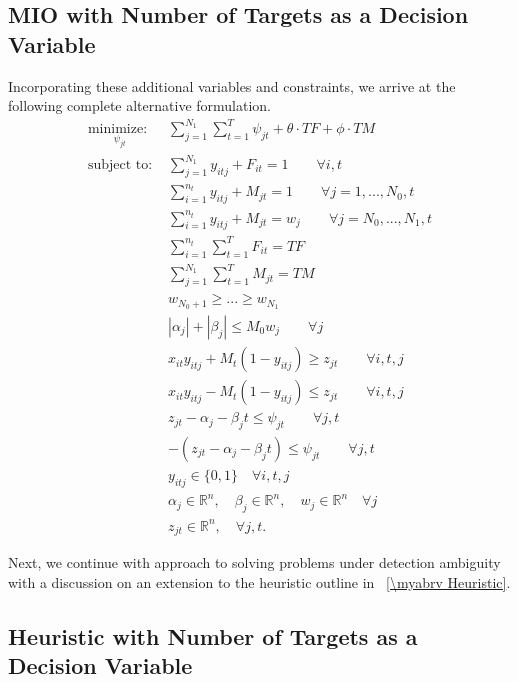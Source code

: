 \subsection{MIO with Number of Targets as a Decision Variable}
Incorporating these additional variables and constraints, we arrive at the following complete alternative formulation.
\begin{align*}
\underset{\psi_{jt}}{\text{minimize: }} & \sum_{j=1}^{N_{1}} \sum_{t=1}^{T} \psi_{jt} + \theta \cdot TF + \phi \cdot TM\\
\text{subject to: }	& \sum_{j=1}^{N_{1}} y_{itj} + F_{it} = 1 \qquad \forall i,t \nonumber\\
				& \sum_{i=1}^{n_{t}} y_{itj} + M_{jt} = 1 \qquad \forall j=1,...,N_{0},t \nonumber \\
				& \sum_{i=1}^{n_{t}} y_{itj} + M_{jt} = w_{j} \qquad \forall j=N_{0},...,N_{1},t \nonumber \\
				& \sum_{i=1}^{n_{t}} \sum_{t=1}^{T} F_{it} = TF \nonumber \\
				& \sum_{j=1}^{N_{1}} \sum_{t=1}^{T} M_{jt} = TM \nonumber \\
				& w_{N_0+1}\geq ...\geq w_{N_1} \nonumber \\
				& |\alpha_{j}|+|\beta_{j}| \leq M_{0}w_{j}\qquad \forall j \nonumber \\
				& x_{it}y_{itj} + M_{t}(1-y_{itj}) \geq z_{jt} \qquad \forall i,t,j \nonumber \\
				& x_{it}y_{itj} - M_{t}(1-y_{itj}) \leq z_{jt} \qquad \forall i,t,j \nonumber \\
				& z_{jt} - \alpha_{j} - \beta_{j}t \leq \psi_{jt} \qquad \forall j,t \nonumber \\
				& -(z_{jt} - \alpha_{j} - \beta_{j}t) \leq \psi_{jt} \qquad \forall j,t \nonumber \\
			 	& y_{itj} \in \{0,1\} \quad \forall i,t,j \nonumber \\
				& \alpha_{j} \in \mathbb{R}^n,\quad \beta_{j} \in \mathbb{R}^n,\quad w_{j} \in \mathbb{R}^n \quad \forall j \nonumber \\
				& z_{jt} \in \mathbb{R}^n, \quad \forall j,t. \nonumber
\end{align*}

Next, we continue with approach to solving problems under detection ambiguity with a discussion on an extension to the heuristic outline in \mysection~\ref{\myabrv Heuristic}. 

\subsection{Heuristic with Number of Targets as a Decision Variable}